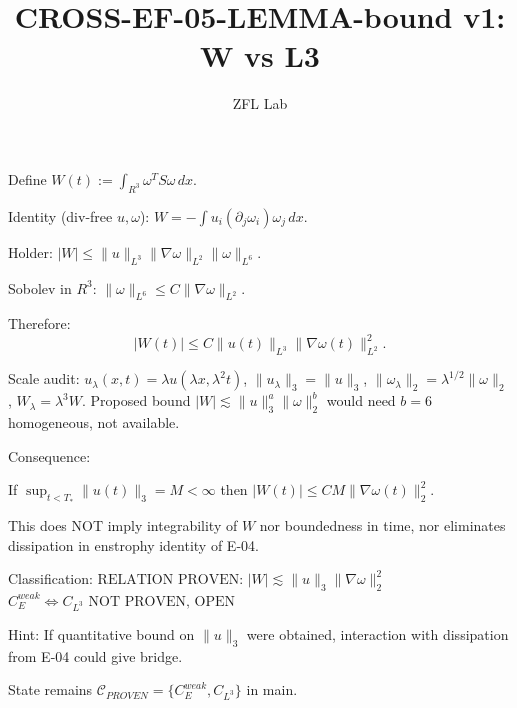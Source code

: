\documentclass[11pt]{article}
\title{CROSS-EF-05-LEMMA-bound v1: W vs L3}
\author{ZFL Lab}
\begin{document}
\maketitle

Define
$W(t):=\int_{R^3} \omega^T S \omega\,dx$.

Identity (div-free $u,\omega$):
$W = -\int u_i (\partial_j \omega_i) \omega_j\,dx$.

Holder:
$|W| \le \|u\|_{L^3} \|\nabla\omega\|_{L^2} \|\omega\|_{L^6}$.

Sobolev in $R^3$:
$\|\omega\|_{L^6} \le C \|\nabla\omega\|_{L^2}$.

Therefore:
\begin{equation*}
\boxed{|W(t)| \le C \|u(t)\|_{L^3} \|\nabla\omega(t)\|_{L^2}^2.}
\end{equation*}

Scale audit:
$u_\lambda(x,t)=\lambda u(\lambda x,\lambda^2 t)$,
$\|u_\lambda\|_3=\|u\|_3$,
$\|\omega_\lambda\|_2=\lambda^{1/2}\|\omega\|_2$,
$W_\lambda=\lambda^3 W$.
Proposed bound $|W|\lesssim\|u\|_3^a\|\omega\|_2^b$ would need $b=6$ homogeneous, not available.

Consequence:

If $\sup_{t<T_*}\|u(t)\|_3=M<\infty$ then
$|W(t)| \le C M \|\nabla\omega(t)\|_2^2$.

This does NOT imply integrability of $W$ nor boundedness in time, nor eliminates dissipation in enstrophy identity of E-04.

Classification:
$\boxed{\text{RELATION PROVEN: } |W|\lesssim\|u\|_3\|\nabla\omega\|_2^2}$
$\boxed{C_E^{weak}\iff C_{L^3}\text{ NOT PROVEN, OPEN}}$

Hint: If quantitative bound on $\|u\|_3$ were obtained, interaction with dissipation from E-04 could give bridge.

State remains $\mathcal{C}_{PROVEN}=\{C_E^{weak},C_{L^3}\}$ in main.
\end{document}
